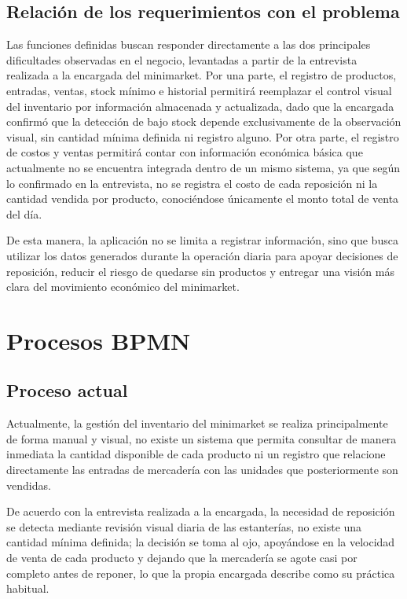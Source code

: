 \documentclass[10pt,a4paper]{article}
\begin{document}
\subsection{Relación de los requerimientos con el problema}

Las funciones definidas buscan responder directamente a las dos principales dificultades observadas en el negocio, levantadas a partir de la entrevista realizada a la encargada del minimarket. Por una parte, el registro de productos, entradas, ventas, stock mínimo e historial permitirá reemplazar el control visual del inventario por información almacenada y actualizada, dado que la encargada confirmó que la detección de bajo stock depende exclusivamente de la observación visual, sin cantidad mínima definida ni registro alguno. Por otra parte, el registro de costos y ventas permitirá contar con información económica básica que actualmente no se encuentra integrada dentro de un mismo sistema, ya que según lo confirmado en la entrevista, no se registra el costo de cada reposición ni la cantidad vendida por producto, conociéndose únicamente el monto total de venta del día.

De esta manera, la aplicación no se limita a registrar información, sino que busca utilizar los datos generados durante la operación diaria para apoyar decisiones de reposición, reducir el riesgo de quedarse sin productos y entregar una visión más clara del movimiento económico del minimarket.

\section{Procesos BPMN}

\subsection{Proceso actual}

Actualmente, la gestión del inventario del minimarket se realiza principalmente de forma manual y visual, no existe un sistema que permita consultar de manera inmediata la cantidad disponible de cada producto ni un registro que relacione directamente las entradas de mercadería con las unidades que posteriormente son vendidas.

De acuerdo con la entrevista realizada a la encargada, la necesidad de reposición se detecta mediante revisión visual diaria de las estanterías, no existe una cantidad mínima definida; la decisión se toma al ojo, apoyándose en la velocidad de venta de cada producto y dejando que la mercadería se agote casi por completo antes de reponer, lo que la propia encargada describe como su práctica habitual.
\end{document}
